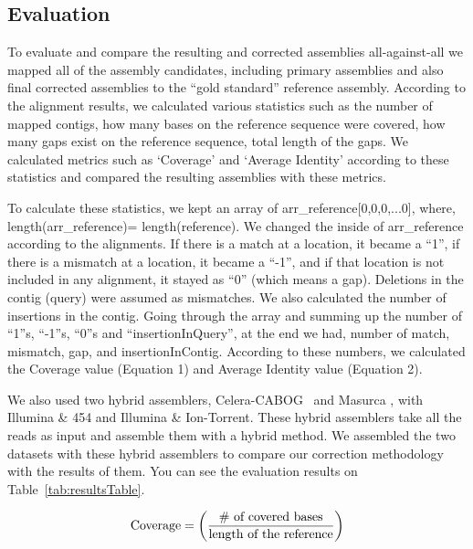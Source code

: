 \documentclass{llncs}
\begin{document}
\subsection{Evaluation}

To evaluate and compare the resulting and corrected assemblies all-against-all we mapped all of the assembly candidates, including primary assemblies and also final corrected assemblies to the ``gold standard'' reference assembly. According to the alignment results, we calculated various statistics such as the number of mapped contigs, how many bases on the reference sequence were covered, how many gaps exist on the reference sequence, total length of the gaps. We calculated metrics such as `Coverage' and `Average Identity' according to these statistics and compared the resulting assemblies with these metrics. 

To calculate these statistics, we kept an array of arr{\_}reference[0,0,0,...0], where,
\\length(arr{\_}reference)= length(reference). 
We changed the inside of arr{\_}reference according to the alignments. 
If there is a match at a location, it became a ``1'', if there is a mismatch at a location, it became a ``-1'', and if that location is not included in any alignment, it stayed as ``0'' (which means a gap). Deletions in the contig (query) were assumed as mismatches. 
We also calculated the number of insertions in the contig. 
Going through the array and summing up the number of ``1''s, ``-1''s, ``0''s and ``insertionInQuery'', at the end we had, number of match, mismatch, gap, and insertionInContig. 
According to these numbers, we calculated the Coverage value (Equation 1) and Average Identity value (Equation 2).

We also used two hybrid assemblers, Celera-CABOG~\cite{cabogMiller:2008} and Masurca \cite{masurcaZimin:2013}, with Illumina \& 454 and Illumina & Ion-Torrent. These hybrid assemblers take all the reads as input and assemble them with a hybrid method. We assembled the two datasets with these hybrid assemblers to compare our correction methodology with the results of them. 
You can see the evaluation results on Table~\ref{tab:resultsTable}. 


\begin{equation}
\textnormal{Coverage} = \left(\frac{\textnormal{\#{ }of{ }covered{ }bases}}{\textnormal{length of the reference}}\right)
\end{equation}
\end{document}
